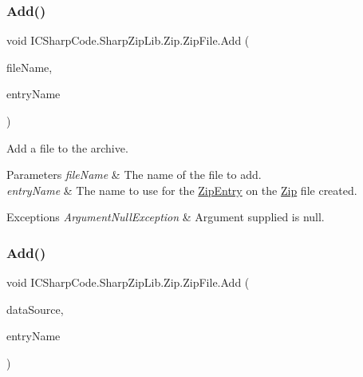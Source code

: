 \subsubsection{\texorpdfstring{Add()}{Add()}\hspace{0.1cm}{\footnotesize\ttfamily [4/8]}}
{\footnotesize\ttfamily void I\+C\+Sharp\+Code.\+Sharp\+Zip\+Lib.\+Zip.\+Zip\+File.\+Add (\begin{DoxyParamCaption}\item[{string}]{file\+Name,  }\item[{string}]{entry\+Name }\end{DoxyParamCaption})\hspace{0.3cm}{\ttfamily [inline]}}



Add a file to the archive. 


\begin{DoxyParams}{Parameters}
{\em file\+Name} & The name of the file to add.\\
\hline
{\em entry\+Name} & The name to use for the \hyperlink{class_i_c_sharp_code_1_1_sharp_zip_lib_1_1_zip_1_1_zip_entry}{Zip\+Entry} on the \hyperlink{namespace_i_c_sharp_code_1_1_sharp_zip_lib_1_1_zip}{Zip} file created.\\
\hline
\end{DoxyParams}

\begin{DoxyExceptions}{Exceptions}
{\em Argument\+Null\+Exception} & Argument supplied is null.\\
\hline
\end{DoxyExceptions}
\mbox{\label{class_i_c_sharp_code_1_1_sharp_zip_lib_1_1_zip_1_1_zip_file_a9fbaf6bf4b9b79890ef7b85f3378fa35}} 
\subsubsection{\texorpdfstring{Add()}{Add()}\hspace{0.1cm}{\footnotesize\ttfamily [5/8]}}
{\footnotesize\ttfamily void I\+C\+Sharp\+Code.\+Sharp\+Zip\+Lib.\+Zip.\+Zip\+File.\+Add (\begin{DoxyParamCaption}\item[{\hyperlink{interface_i_c_sharp_code_1_1_sharp_zip_lib_1_1_zip_1_1_i_static_data_source}{I\+Static\+Data\+Source}}]{data\+Source,  }\item[{string}]{entry\+Name }\end{DoxyParamCaption})\hspace{0.3cm}{\ttfamily [inline]}}



